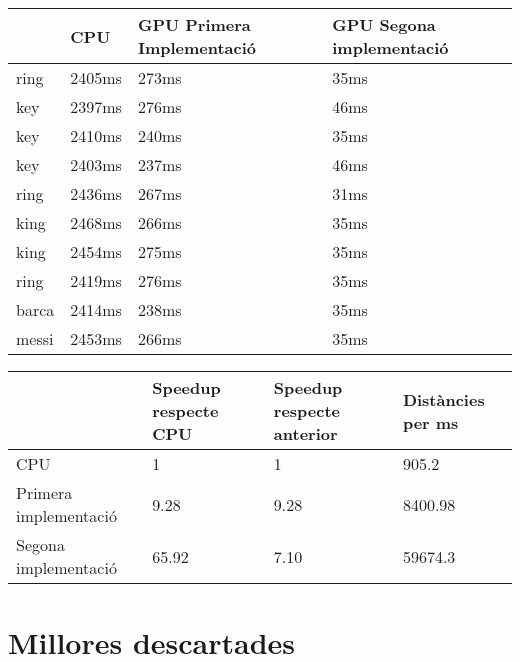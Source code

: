 \documentclass[catalan,10pt,a4paper]{article}
\begin{document}
\begin{table}[h]
\centering
\begin{tabular}{|l|l|l|l|}
\hline
      & CPU  & GPU Primera Implementació & GPU Segona implementació \\ \hline
ring  & 2405ms & 273ms & 35ms  \\ \hline
key   & 2397ms & 276ms & 46ms  \\ \hline
key   & 2410ms & 240ms & 35ms  \\ \hline
key   & 2403ms & 237ms & 46ms  \\ \hline
ring  & 2436ms & 267ms & 31ms  \\ \hline
king  & 2468ms & 266ms & 35ms  \\ \hline
king  & 2454ms & 275ms & 35ms  \\ \hline
ring  & 2419ms & 276ms & 35ms  \\ \hline
barca & 2414ms & 238ms & 35ms  \\ \hline
messi & 2453ms & 266ms & 35ms  \\ \hline
\end{tabular}
\end{table}




\begin{table}[h]
\centering
\begin{tabular}{|l|l|l|l|}
\hline
      & Speedup respecte CPU & Speedup respecte anterior & Distàncies per ms \\ \hline
CPU & 1 & 1 & 905.2 \\ \hline
Primera implementació & 9.28 & 9.28 & 8400.98 \\ \hline
Segona implementació & 65.92 & 7.10 & 59674.3  \\ \hline
\end{tabular}
\end{table}

\newpage

\section*{Millores descartades}

\newpage


\end{document}
